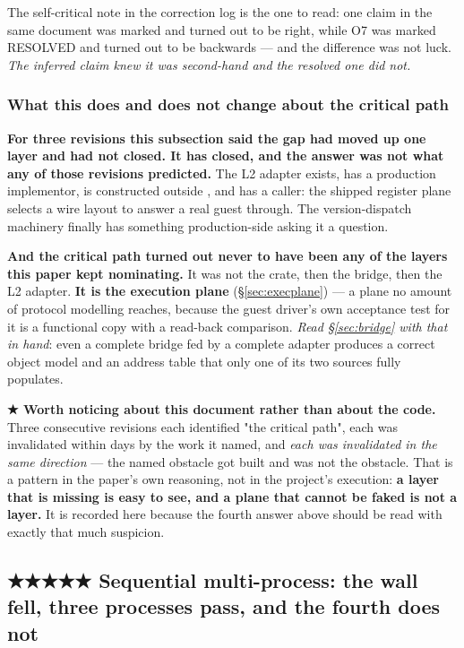 \documentclass[10.5pt]{article}
\begin{document}
The self-critical note in the correction log is the one to read: one claim in the same document
was marked \code{[inferred]} and turned out to be right, while O7 was marked RESOLVED and turned
out to be backwards — and the difference was not luck. \emph{The inferred claim knew it was
second-hand and the resolved one did not.}

\subsubsection*{What this does and does not change about the critical path}

\textbf{For three revisions this subsection said the gap had moved up one layer and had not
closed. It has closed, and the answer was not what any of those revisions predicted.} The L2
adapter exists,  has a production implementor,  is constructed
outside , and  has a caller: the shipped register
plane selects a wire layout to answer a real guest through. The version-dispatch machinery
finally has something production-side asking it a question.

\textbf{And the critical path turned out never to have been any of the layers this paper kept
nominating.} It was not the crate, then the bridge, then the L2 adapter. \textbf{It is the
execution plane} (\S\ref{sec:execplane}) — a plane no amount of protocol modelling reaches,
because the guest driver's own acceptance test for it is a functional copy with a read-back
comparison. \emph{Read \S\ref{sec:bridge} with that in hand}: even a complete bridge fed by a
complete adapter produces a correct object model and an address table that only one of its two
sources fully populates.

\begin{claimbox}\small
\textbf{★ Worth noticing about this document rather than about the code.} Three consecutive
revisions each identified "the critical path", each was invalidated within days by the work it
named, and \emph{each was invalidated in the same direction} — the named obstacle got built and
was not the obstacle. That is a pattern in the paper's own reasoning, not in the project's
execution: \textbf{a layer that is missing is easy to see, and a plane that cannot be faked is
not a layer.} It is recorded here because the fourth answer above should be read with exactly
that much suspicion.
\end{claimbox}

\subsection{\texorpdfstring{★★★★★ Sequential multi-process: the wall fell, three processes pass, and the fourth does not}{Sequential multi-process: the wall fell, three processes pass, and the fourth does not}}
\label{sec:seqfix}
\end{document}
